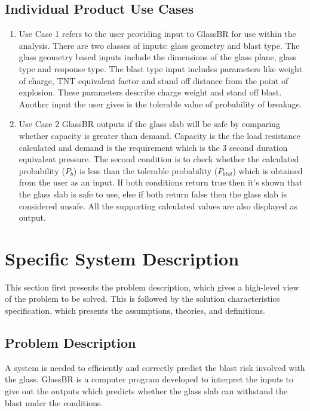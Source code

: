 \documentclass[12pt]{article}
\begin{document}
\subsection{Individual Product Use Cases}
\label{Sec:IndiProdUseCase}
\begin{enumerate}
\item{Use Case 1 refers to the user providing input to GlassBR for use within the analysis. There are two classes of inputs: glass geometry and blast type. The glass geometry based inputs include the dimensions of the glass plane, glass type and response type. The blast type input includes parameters like weight of charge, TNT equivalent factor and stand off distance from the point of explosion. These parameters describe charge weight and stand off blast. Another input the user gives is the tolerable value of probability of breakage.}
\item{ Use Case 2 GlassBR outputs if the glass slab will be safe by comparing whether capacity is greater than demand. Capacity is the the load resistance calculated and demand is the requirement which is the 3 second duration equivalent pressure. The second condition is to check whether the calculated probability ($P_{b}$) is less than the tolerable probability ($P_{btol}$) which is obtained from the user as an input. If both conditions return true then it's shown that the glass slab is safe to use, else if both return false then the glass slab is considered unsafe. All the supporting calculated values are also displayed as output.}
\end{enumerate}
\section{Specific System Description}
\label{Sec:SpecSystDesc}
This section first presents the problem description, which gives a high-level view of the problem to be solved. This is followed by the solution characteristics specification, which presents the assumptions, theories, and definitions.
\subsection{Problem Description}
\label{Sec:ProbDesc}
A system is needed to efficiently and correctly predict the blast risk involved with the glass. GlassBR is a computer program developed to interpret the inputs to give out the outputs which predicts whether the glass slab can withstand the blast under the conditions.
\end{document}
